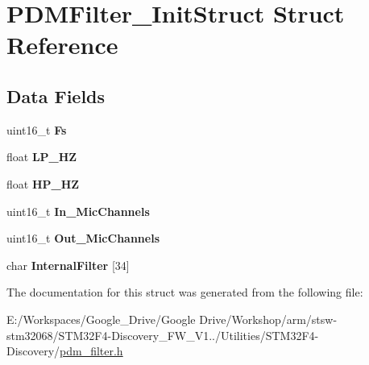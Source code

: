 \hypertarget{struct_p_d_m_filter___init_struct}{\section{P\-D\-M\-Filter\-\_\-\-Init\-Struct Struct Reference}
\label{struct_p_d_m_filter___init_struct}
}
\subsection*{Data Fields}
\begin{DoxyCompactItemize}
\item 
\hypertarget{struct_p_d_m_filter___init_struct_a3304bb04ffb47c4f16aca62c2c850001}{uint16\-\_\-t {\bfseries Fs}}\label{struct_p_d_m_filter___init_struct_a3304bb04ffb47c4f16aca62c2c850001}

\item 
\hypertarget{struct_p_d_m_filter___init_struct_a36f812b986aa9568fef7d198fd8e5ff7}{float {\bfseries L\-P\-\_\-\-H\-Z}}\label{struct_p_d_m_filter___init_struct_a36f812b986aa9568fef7d198fd8e5ff7}

\item 
\hypertarget{struct_p_d_m_filter___init_struct_a55e572aa28ca0a39c623537be7b3ae33}{float {\bfseries H\-P\-\_\-\-H\-Z}}\label{struct_p_d_m_filter___init_struct_a55e572aa28ca0a39c623537be7b3ae33}

\item 
\hypertarget{struct_p_d_m_filter___init_struct_affd42a97689a6c3bf3463d9ee6ee5d05}{uint16\-\_\-t {\bfseries In\-\_\-\-Mic\-Channels}}\label{struct_p_d_m_filter___init_struct_affd42a97689a6c3bf3463d9ee6ee5d05}

\item 
\hypertarget{struct_p_d_m_filter___init_struct_a43d6154f7b8df018d35574d1e367d0f5}{uint16\-\_\-t {\bfseries Out\-\_\-\-Mic\-Channels}}\label{struct_p_d_m_filter___init_struct_a43d6154f7b8df018d35574d1e367d0f5}

\item 
\hypertarget{struct_p_d_m_filter___init_struct_a1f081865bed654c40e5a26c000df131b}{char {\bfseries Internal\-Filter} \mbox{[}34\mbox{]}}\label{struct_p_d_m_filter___init_struct_a1f081865bed654c40e5a26c000df131b}

\end{DoxyCompactItemize}


The documentation for this struct was generated from the following file\-:\begin{DoxyCompactItemize}
\item 
E\-:/\-Workspaces/\-Google\-\_\-\-Drive/\-Google Drive/\-Workshop/arm/stsw-\/stm32068/\-S\-T\-M32\-F4-\/\-Discovery\-\_\-\-F\-W\-\_\-\-V1../\-Utilities/\-S\-T\-M32\-F4-\/\-Discovery/\hyperlink{pdm__filter_8h}{pdm\-\_\-filter.\-h}\end{DoxyCompactItemize}
